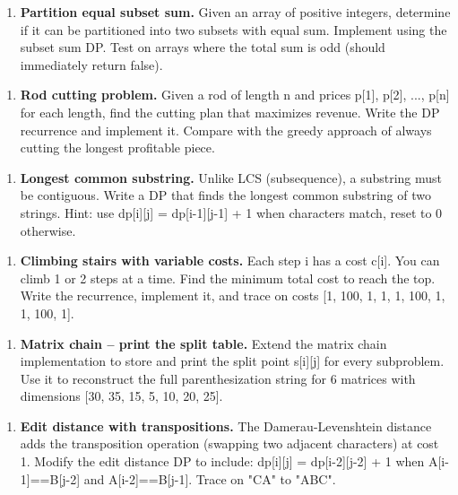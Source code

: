 \begin{enumerate}
\item \textbf{Partition equal subset sum.} Given an array of positive integers, determine if it can be partitioned into two subsets with equal sum. Implement using the subset sum DP. Test on arrays where the total sum is odd (should immediately return false).
\end{enumerate}

\begin{enumerate}
\item \textbf{Rod cutting problem.} Given a rod of length n and prices p[1], p[2], ..., p[n] for each length, find the cutting plan that maximizes revenue. Write the DP recurrence and implement it. Compare with the greedy approach of always cutting the longest profitable piece.
\end{enumerate}

\begin{enumerate}
\item \textbf{Longest common substring.} Unlike LCS (subsequence), a substring must be contiguous. Write a DP that finds the longest common substring of two strings. Hint: use dp[i][j] = dp[i-1][j-1] + 1 when characters match, reset to 0 otherwise.
\end{enumerate}

\begin{enumerate}
\item \textbf{Climbing stairs with variable costs.} Each step i has a cost c[i]. You can climb 1 or 2 steps at a time. Find the minimum total cost to reach the top. Write the recurrence, implement it, and trace on costs [1, 100, 1, 1, 1, 100, 1, 1, 100, 1].
\end{enumerate}

\begin{enumerate}
\item \textbf{Matrix chain -- print the split table.} Extend the matrix chain implementation to store and print the split point s[i][j] for every subproblem. Use it to reconstruct the full parenthesization string for 6 matrices with dimensions [30, 35, 15, 5, 10, 20, 25].
\end{enumerate}

\begin{enumerate}
\item \textbf{Edit distance with transpositions.} The Damerau-Levenshtein distance adds the transposition operation (swapping two adjacent characters) at cost 1. Modify the edit distance DP to include: dp[i][j] = dp[i-2][j-2] + 1 when A[i-1]==B[j-2] and A[i-2]==B[j-1]. Trace on "CA" to "ABC".
\end{enumerate}

